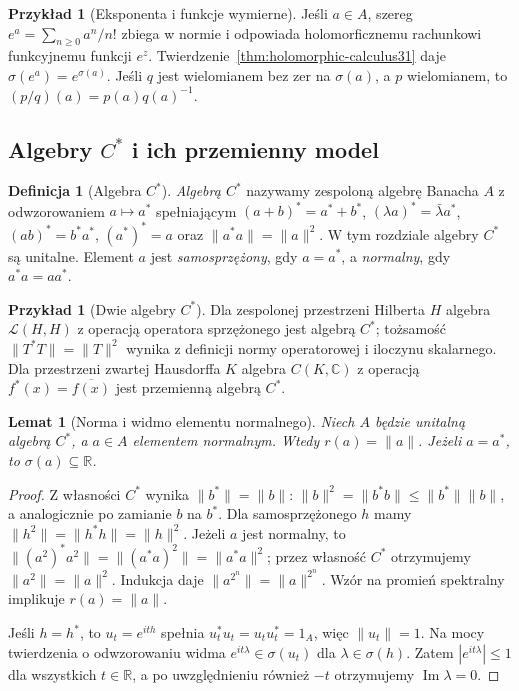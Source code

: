 \documentclass[11pt,a4paper]{article}
\numberwithin{equation}{section}
\theoremstyle{plain}
\newtheorem{lemat}[twierdzenie]{Lemat}
\theoremstyle{definition}
\newtheorem{definicja}[twierdzenie]{Definicja}
\newtheorem{przyklad}[twierdzenie]{Przykład}
\theoremstyle{remark}
\newcommand{\R}{\mathbb R}
\newcommand{\C}{\mathbb C}
\begin{document}
\begin{przyklad}[Eksponenta i funkcje wymierne]
Jeśli $a\in A$, szereg
$e^a=\sum_{n\ge0}a^n/n!$ zbiega w normie i odpowiada
holomorficznemu rachunkowi funkcyjnemu funkcji $e^z$.
Twierdzenie~\ref{thm:holomorphic-calculus31} daje
$\sigma(e^a)=e^{\sigma(a)}$.
Jeśli $q$ jest wielomianem bez zer na $\sigma(a)$,
a $p$ wielomianem, to $(p/q)(a)=p(a)q(a)^{-1}$.
\end{przyklad}

\subsection{Algebry \texorpdfstring{$C^*$}{C*} i ich przemienny model}

\begin{definicja}[Algebra $C^*$]
\label{def:cstar31}
\emph{Algebrą $C^*$} nazywamy zespoloną algebrę Banacha $A$
z odwzorowaniem $a\mapsto a^*$ spełniającym
$(a+b)^*=a^*+b^*$, $(\lambda a)^*=\bar\lambda a^*$,
$(ab)^*=b^*a^*$, $(a^*)^*=a$ oraz
$\|a^*a\|=\|a\|^2$. W tym rozdziale algebry $C^*$
są unitalne. Element $a$ jest \emph{samosprzężony}, gdy $a=a^*$,
a \emph{normalny}, gdy $a^*a=aa^*$.
\end{definicja}

\begin{przyklad}[Dwie algebry $C^*$]
Dla zespolonej przestrzeni Hilberta $H$ algebra $\mathcal L(H,H)$
z operacją operatora sprzężonego jest algebrą $C^*$;
tożsamość $\|T^*T\|=\|T\|^2$ wynika z definicji
normy operatorowej i iloczynu skalarnego.
Dla przestrzeni zwartej Hausdorffa $K$ algebra $C(K,\C)$
z operacją $f^*(x)=\overline{f(x)}$ jest przemienną algebrą $C^*$.
\end{przyklad}

\begin{lemat}[Norma i widmo elementu normalnego]
\label{lem:cstar-normal31}
Niech $A$ będzie unitalną algebrą $C^*$, a $a\in A$ elementem
normalnym. Wtedy $r(a)=\|a\|$.
Jeżeli $a=a^*$, to $\sigma(a)\subseteq\R$.
\end{lemat}
\begin{proof}
Z własności $C^*$ wynika $\|b^*\|=\|b\|$:
$\|b\|^2=\|b^*b\|\le\|b^*\|\|b\|$,
a analogicznie po zamianie $b$ na $b^*$.
Dla samosprzężonego $h$ mamy
$\|h^2\|=\|h^*h\|=\|h\|^2$.
Jeżeli $a$ jest normalny, to
$\|(a^2)^*a^2\|=\|(a^*a)^2\|=\|a^*a\|^2$;
przez własność $C^*$ otrzymujemy $\|a^2\|=\|a\|^2$.
Indukcja daje $\|a^{2^n}\|=\|a\|^{2^n}$.
Wzór na promień spektralny implikuje $r(a)=\|a\|$.

Jeśli $h=h^*$, to $u_t=e^{ith}$ spełnia
$u_t^*u_t=u_tu_t^*=1_A$, więc $\|u_t\|=1$.
Na mocy twierdzenia o odwzorowaniu widma
$e^{it\lambda}\in\sigma(u_t)$ dla $\lambda\in\sigma(h)$.
Zatem $|e^{it\lambda}|\le1$ dla wszystkich $t\in\R$,
a po uwzględnieniu również $-t$ otrzymujemy
$\operatorname{Im}\lambda=0$.
\end{proof}
\end{document}
